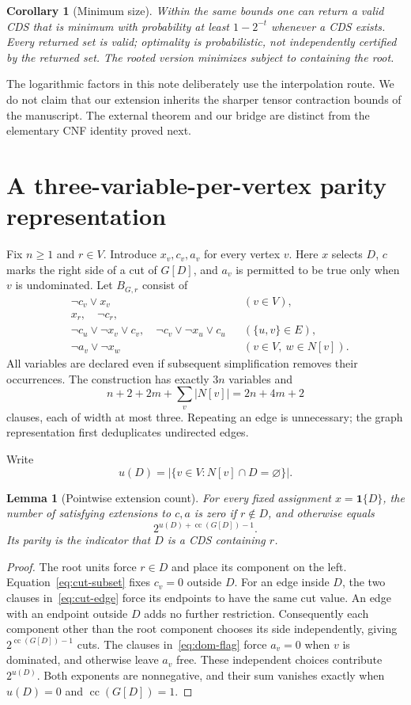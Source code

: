 \documentclass[11pt]{article}
\newtheorem{lemma}[theorem]{Lemma}
\newtheorem{corollary}[theorem]{Corollary}
\theoremstyle{remark}\newtheorem{remark}[theorem]{Remark}
\newcommand{\cc}{\operatorname{cc}}
\newcommand{\ind}[1]{\mathbf 1\{#1\}}
\begin{document}
\begin{corollary}[Minimum size]\label{cor:minimum}
Within the same bounds one can return a valid CDS that is minimum with
probability at least $1-2^{-t}$ whenever a CDS exists. Every returned set is
valid; optimality is probabilistic, not independently certified by the
returned set. The rooted version minimizes subject to containing the root.
\end{corollary}

The logarithmic factors in this note deliberately use the interpolation
route. We do not claim that our extension inherits the sharper tensor
contraction bounds of the manuscript. The external theorem and our bridge
are distinct from the elementary CNF identity proved next.

\section{A three-variable-per-vertex parity representation}
Fix $n\ge1$ and $r\in V$. Introduce $x_v,c_v,a_v$ for every vertex $v$.
Here $x$ selects $D$, $c$ marks the right side of a cut of $G[D]$, and
$a_v$ is permitted to be true only when $v$ is undominated. Let $B_{G,r}$
consist of
\begin{align}
 &\neg c_v\vee x_v &&(v\in V),\label{eq:cut-subset}\\
 &x_r,\quad\neg c_r,\label{eq:root}\\
 &\neg c_u\vee\neg x_v\vee c_v,\quad
   \neg c_v\vee\neg x_u\vee c_u &&(\{u,v\}\in E),\label{eq:cut-edge}\\
 &\neg a_v\vee\neg x_w &&(v\in V,\ w\in N[v]).\label{eq:dom-flag}
\end{align}
All variables are declared even if subsequent simplification removes their
occurrences. The construction has exactly $3n$ variables and
\[
 n+2+2m+\sum_v|N[v]|=2n+4m+2
\]
clauses, each of width at most three. Repeating an edge is unnecessary;
the graph representation first deduplicates undirected edges.

Write
\[
 u(D)=|\{v\in V:N[v]\cap D=\varnothing\}|.
\]
\begin{lemma}[Pointwise extension count]\label{lem:fibre}
For every fixed assignment $x=\ind{D}$, the number of satisfying
extensions to $c,a$ is zero if $r\notin D$, and otherwise equals
\[
 2^{u(D)+\cc(G[D])-1}.
\]
Its parity is the indicator that $D$ is a CDS containing $r$.
\end{lemma}
\begin{proof}
The root units force $r\in D$ and place its component on the left.
Equation~\eqref{eq:cut-subset} fixes $c_v=0$ outside $D$.
For an edge inside $D$, the two clauses in~\eqref{eq:cut-edge} force its
endpoints to have the same cut value. An edge with an endpoint outside
$D$ adds no further restriction. Consequently each component other than
the root component chooses its side independently, giving
$2^{\cc(G[D])-1}$ cuts. The clauses in~\eqref{eq:dom-flag} force $a_v=0$
when $v$ is dominated, and otherwise leave $a_v$ free. These independent
choices contribute $2^{u(D)}$. Both exponents are nonnegative, and their
sum vanishes exactly when $u(D)=0$ and $\cc(G[D])=1$.
\end{proof}
\end{document}
